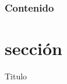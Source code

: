 
\begin{frame}
    \frametitle{Contenido}
    \tableofcontents
\end{frame}

\section{sección}

\begin{frame}[c]{Titulo}
\end{frame}
